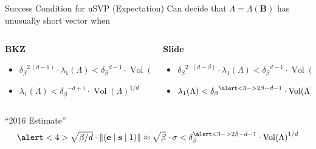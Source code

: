 \documentclass[table,10pt,aspectratio=169]{beamer}
\DeclareMathOperator{\Vol}{Vol}
\renewcommand{\vec}[1]{\ensuremath{\mathbf{#1}}\xspace}
\newcommand{\norm}[1]{\left\lVert#1\right\rVert}
\providecommand{\mat}[1]{\ensuremath{\vec{#1}}\xspace}
\begin{document}
\begin{frame}[label={sec:org288da69}]{Success Condition for uSVP (Expectation)}
Can decide that \(\Lambda = \Lambda(\mat{B})\) has unusually short vector when

\vspace{1em}

\begin{columns}[t]
\begin{column}{0.45\columnwidth}
\textbf{BKZ}

\begin{itemize}
\item \({\delta_{\beta}}^{2\,(d-1)} \cdot \lambda_{1}(\Lambda) < {\delta_{\beta}}^{d-1} \cdot {\Vol(\Lambda)}^{1/d}\)

\item \(\lambda_{1}(\Lambda) < {\delta_{\beta}}^{-d+1} \cdot {\Vol(\Lambda)}^{1/d}\)
\end{itemize}
\end{column}


\begin{column}{0.45\columnwidth}
\textbf{Slide}

\begin{itemize}
\item \({\delta_{\beta}}^{2\cdot(d-\beta)} \cdot \lambda_{1}(\Lambda) < {\delta_{\beta}}^{d-1} \cdot {\Vol(\Lambda)}^{1/d}\)
\item \(\lambda_{1}(\Lambda) < {\delta_{\beta}}^{\alert<3->{2\beta-d-1}} \cdot {\Vol(\Lambda)}^{1/d}\)
\end{itemize}

\pause
\end{column}
\end{columns}

\begin{block}{“2016 Estimate”}
\[\alert<4>{\sqrt{\beta/d}} \cdot \norm{(\vec{e} \mid \vec{s} \mid 1)} \approx \sqrt{\beta} \cdot \sigma < \delta_{\beta}^{\alert<3->{2\beta-d-1}} \cdot {\Vol(\Lambda)}^{1/d}\]

\scriptsize{


}
\end{block}
\end{frame}
\end{document}

